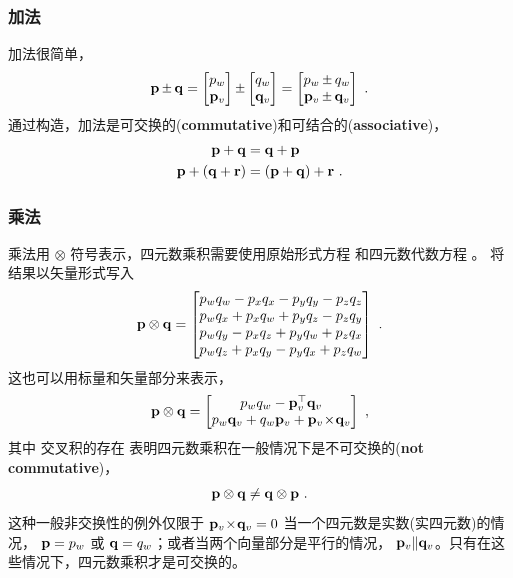 \subsubsection{加法}

加法很简单，
%
\begin{align}
\bfp\pm\bfq = \begin{bmatrix}
p_w \\ \pv
\end{bmatrix} \pm \begin{bmatrix}
q_w \\ \qv
\end{bmatrix}
  = \begin{bmatrix}
p_w \pm q_w \\ \pv \pm \qv
\end{bmatrix}~.
\end{align}
%
通过构造，加法是可交换的(\textbf{commutative})和可结合的(\textbf{associative})，
%
%
\begin{align}
{\bf p}+{\bf q}&={\bf q}+{\bf p} \\
{\bf p}+({\bf q}+{\bf r})&=({\bf p}+{\bf q})+{\bf r}
~.
\end{align}%
%

\subsubsection{乘法}

乘法用 $\otimes$ 符号表示，四元数乘积需要使用原始形式方程  和四元数代数方程 。
将结果以矢量形式写入
%
\begin{align}
{\bf p}\otimes{\bf q} = \begin{bmatrix}
p_wq_w - p_{x}q_{x} - p_{y}q_{y} - p_{z}q_{z} \\
p_wq_{x} + p_{x}q_w + p_{y}q_{z} - p_{z}q_{y} \\
p_wq_{y} - p_{x}q_{z} + p_{y}q_w + p_{z}q_{x} \\
p_wq_{z} + p_{x}q_{y} - p_{y}q_{x} + p_{z}q_w  
\end{bmatrix}~. \label{equ:quatProd}
\end{align}
%
这也可以用标量和矢量部分来表示，
%
\begin{align}
{\bf p}\otimes{\bf q} = \begin{bmatrix}
p_wq_w - {\bf p}_v^{\top}{\bf q}_v \\
p_w{\bf q}_v+q_w{\bf p}_v+{\bf p}_v\!\times\!{\bf q}_v
\end{bmatrix}~, \label{equ:quatProdVec}
\end{align}
%
其中
交叉积的存在
表明四元数乘积在一般情况下是不可交换的(\textbf{not commutative})，
%
\begin{align}
{\bf p}\otimes{\bf q}\neq{\bf q}\otimes{\bf p}~.
\end{align}
%
这种一般非交换性的例外仅限于 ${\bf p}_v\!\times\!{\bf q}_v=0$ 当一个四元数是实数(实四元数)的情况， ${\bf p}=p_w$ 或 ${\bf q}=q_w$；或者当两个向量部分是平行的情况， ${\bf p}_v \| {\bf q}_v$。只有在这些情况下，四元数乘积才是可交换的。

